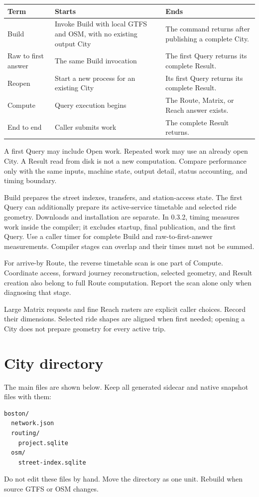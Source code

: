 \documentclass[10pt,letterpaper]{article}
\begin{document}
\begin{center}
\begin{tabularx}{\linewidth}{P{1.05in} Y Y}
\toprule
\textbf{Term} & \textbf{Starts} & \textbf{Ends} \\
\midrule
Build & Invoke Build with local GTFS and OSM, with no existing output City & The command returns after publishing a complete City. \\
Raw to first answer & The same Build invocation & The first Query returns its complete Result. \\
Reopen & Start a new process for an existing City & Its first Query returns its complete Result. \\
Compute & Query execution begins & The Route, Matrix, or Reach answer exists. \\
End to end & Caller submits work & The complete Result returns. \\
\bottomrule
\end{tabularx}
\end{center}

A first Query may include Open work. Repeated work may use an already open City. A Result read from disk is not a new computation. Compare performance only with the same inputs, machine state, output detail, status accounting, and timing boundary.

Build prepares the street indexes, transfers, and station-access state. The first Query can additionally prepare its active-service timetable and selected ride geometry. Downloads and installation are separate. In 0.3.2,  timing  measures work inside the compiler; it excludes startup, final publication, and the first Query. Use a caller timer for complete Build and raw-to-first-answer measurements. Compiler stages can overlap and their times must not be summed.

For arrive-by Route, the reverse timetable scan is one part of Compute. Coordinate access, forward journey reconstruction, selected geometry, and Result creation also belong to full Route computation. Report the scan alone only when diagnosing that stage.

Large Matrix requests and fine Reach rasters are explicit caller choices. Record their dimensions. Selected ride shapes are aligned when first needed; opening a City does not prepare geometry for every active trip.

\section{City directory}

The main files are shown below. Keep all generated sidecar and native snapshot files with them:

\begin{lstlisting}
boston/
  network.json
  routing/
    project.sqlite
  osm/
    street-index.sqlite
\end{lstlisting}

Do not edit these files by hand. Move the directory as one unit. Rebuild when source GTFS or OSM changes.
\end{document}
